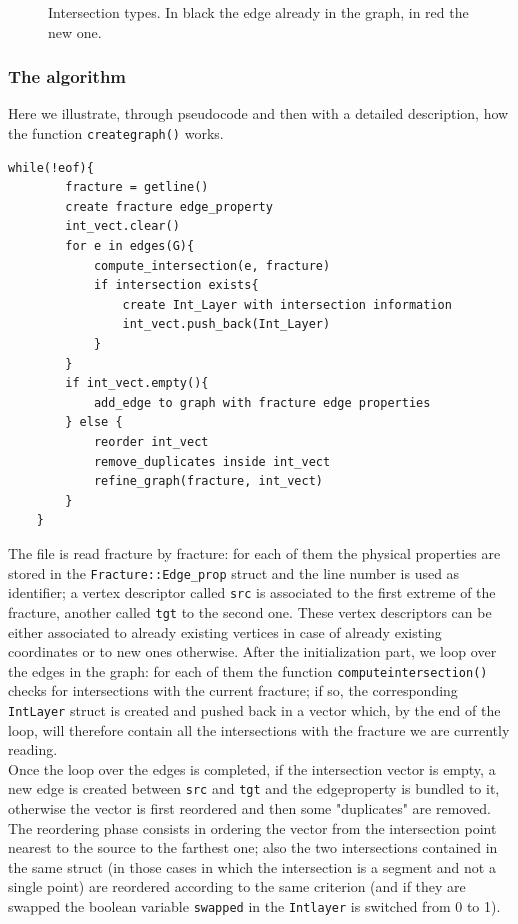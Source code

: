 \documentclass[10pt]{article} %
\begin{document}
	\begin{figure}
		\centering 
		\caption{Intersection types. In black the edge already in the graph, in red the new one.}
		\label{fig:frac_int_type}
	\end{figure}
	\subsubsection{The algorithm}
	Here we illustrate, through pseudocode and then with a detailed description, how the function \texttt{create\textunderscore graph()} works.
	\begin{lstlisting}[frame=single]
	while(!eof){
		fracture = getline()
		create fracture edge_property 
		int_vect.clear()
		for e in edges(G){
			compute_intersection(e, fracture)
			if intersection exists{
				create Int_Layer with intersection information
				int_vect.push_back(Int_Layer)
			}	
		}
		if int_vect.empty(){
			add_edge to graph with fracture edge properties
		} else {
			reorder int_vect
			remove_duplicates inside int_vect
			refine_graph(fracture, int_vect)  
		}
	}
	\end{lstlisting}
	The file is read fracture by fracture: for each of them the physical properties are stored in the \texttt{Fracture::Edge\_prop} struct and the line number is used as identifier; a vertex descriptor called \texttt{src} is associated to the first extreme of the fracture, another called \texttt{tgt} to the second one. These vertex descriptors can be either associated to already existing vertices in case of already existing coordinates or to new ones otherwise. After the initialization part, we loop over the edges in the graph: for each of them the function \texttt{compute\textunderscore intersection()} checks for intersections with the current fracture; if so, the corresponding \texttt{Int\textunderscore Layer} struct is created and pushed back in a vector which, by the end of the loop, will therefore contain all the intersections with the fracture we are currently reading. \\
	Once the loop over the edges is completed, if the intersection vector is empty, a new edge is created between \texttt{src} and \texttt{tgt} and the edge\textunderscore property is bundled to it, otherwise the vector is first reordered and then some "duplicates" are removed.
	The reordering phase consists in ordering the vector from the intersection point nearest to the source to the farthest one; also the two intersections contained in the same struct (in those cases in which the intersection is a segment and not a single point) are reordered according to the same criterion (and if they are swapped the boolean variable \texttt{swapped} in the \texttt{Int\textunderscore layer} is switched from 0 to 1).
\end{document}

